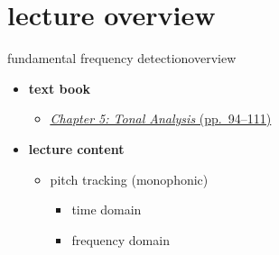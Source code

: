 

\subtitle{Part 6.2: Monophonic Fundamental Frequency Detection}


	

    \section[overview]{lecture overview}
        \begin{frame}{fundamental frequency detection}{overview}
            \begin{itemize}
                \item   \textbf{text book}  
                    \begin{itemize}
                        \item   \href{http://ieeexplore.ieee.org/xpl/articleDetails.jsp?tp=&arnumber=6331122&}{\underline{\textit{Chapter 5: Tonal Analysis} (pp.~94--111)}}
                    \end{itemize}
                \bigskip
                \item<2->   \textbf{lecture content}
                    \begin{itemize}
                        \item<2->   pitch tracking (monophonic)
                            \begin{itemize}
                                \item   time domain
                                \item   frequency domain
                            \end{itemize}
                    \end{itemize}
            \end{itemize}
        \end{frame}

